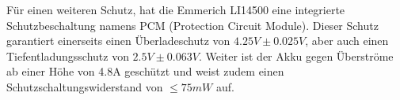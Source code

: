 Für einen weiteren Schutz, hat die Emmerich LI14500 eine integrierte Schutzbeschaltung namens PCM (Protection Circuit Module). Dieser Schutz garantiert einerseits einen Überladeschutz von $4.25V\pm 0.025V$, aber auch einen Tiefentladungsschutz von $2.5V\pm 0.063V$. Weiter ist der Akku gegen Überströme ab einer Höhe von 4.8A geschützt und weist zudem einen Schutzschaltungswiderstand von $\leq 75mW$ auf.

